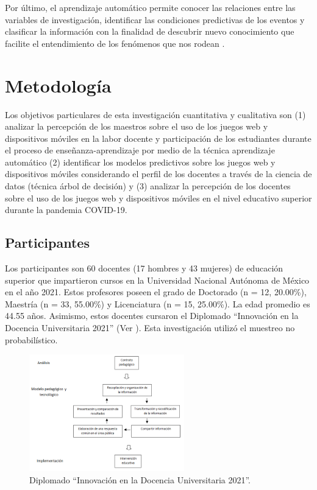 \documentclass[spanish]{textolivre}
\begin{document}
Por último, el aprendizaje automático permite conocer las relaciones entre las variables de investigación, identificar las condiciones predictivas de los eventos y clasificar la información con la finalidad de descubrir nuevo conocimiento que facilite el entendimiento de los fenómenos que nos rodean \cite{chadaga2021, hilbert2021, lezhnina2021}.

\section{Metodología}
Los objetivos particulares de esta investigación cuantitativa y cualitativa son (1) analizar la percepción de los maestros sobre el uso de los juegos web y dispositivos móviles en la labor docente y participación de los estudiantes durante el proceso de enseñanza-aprendizaje por medio de la técnica aprendizaje automático (2) identificar los modelos predictivos sobre los juegos web y dispositivos móviles considerando el perfil de los docentes a través de la ciencia de datos (técnica árbol de decisión) y (3) analizar la percepción de los docentes sobre el uso de los juegos web y dispositivos móviles en el nivel educativo superior durante la pandemia COVID-19.

\subsection{Participantes}
Los participantes son 60 docentes (17 hombres y 43 mujeres) de educación superior que impartieron cursos en la Universidad Nacional Autónoma de México en el año 2021. Estos profesores poseen el grado de Doctorado (n = 12, 20.00\%), Maestría (n = 33, 55.00\%) y Licenciatura (n = 15, 25.00\%). La edad promedio es 44.55 años. Asimismo, estos docentes cursaron el Diplomado “Innovación en la Docencia Universitaria 2021” (Ver ). Esta investigación utilizó el muestreo no probabilístico.

\begin{figure}[htbp]
 \centering
 \includegraphics[width=0.6\textwidth]{37074-pag1.png}
 \caption{Diplomado “Innovación en la Docencia Universitaria 2021”.}
 \label{fig1}
\end{figure}
\end{document}
